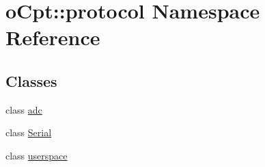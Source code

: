 \hypertarget{namespaceo_cpt_1_1protocol}{}\section{o\+Cpt\+:\+:protocol Namespace Reference}
\label{namespaceo_cpt_1_1protocol}
\subsection*{Classes}
\begin{DoxyCompactItemize}
\item 
class \hyperlink{classo_cpt_1_1protocol_1_1adc}{adc}
\item 
class \hyperlink{classo_cpt_1_1protocol_1_1_serial}{Serial}
\item 
class \hyperlink{classo_cpt_1_1protocol_1_1userspace}{userspace}
\end{DoxyCompactItemize}
